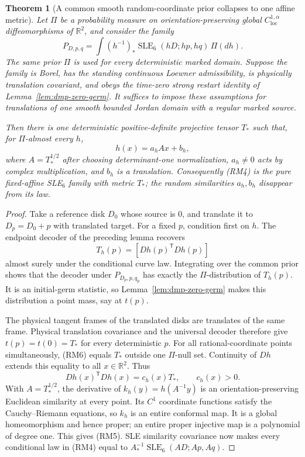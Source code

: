 \documentclass[11pt]{article}
\newtheorem{theorem}{Theorem}[section]
\theoremstyle{definition}\newtheorem{definition}[theorem]{Definition}
\theoremstyle{remark}\newtheorem{remark}[theorem]{Remark}
\begin{document}
\begin{theorem}[A common smooth random-coordinate prior collapses to one affine metric]
\label{thm:random-smooth-chart-rigidity}
Let $\Pi$ be a probability measure on orientation-preserving global
$C^{1,\alpha}_{\mathrm{loc}}$ diffeomorphisms of $\mathbb R^2$, and
consider the family
\[
 P_{D,p,q}=\int
 (h^{-1})_*\operatorname{SLE}_6(hD;hp,hq)\,\Pi(dh).
 \tag{RM4}
\]
The \emph{same prior $\Pi$} is used for every deterministic marked
domain. Suppose the family is Borel, has the standing continuous
Loewner admissibility, is physically translation covariant, and obeys
the time-zero strong restart identity of Lemma~\ref{lem:dmp-zero-germ}.
It suffices to impose these assumptions for translations of one smooth
bounded Jordan domain with a regular marked source.

Then there is one deterministic positive-definite projective tensor
$T_*$ such that, for $\Pi$-almost every $h$,
\[
 h(x)=a_h A x+b_h,
 \tag{RM5}
\]
where $A=T_*^{1/2}$ after choosing determinant-one normalization,
$a_h\ne0$ acts by complex multiplication, and $b_h$ is a translation.
Consequently (RM4) is the pure fixed-affine SLE$_6$ family with metric
$T_*$; the random similarities $a_h,b_h$ disappear from its law.
\end{theorem}
\begin{proof}
Take a reference disk $D_0$ whose source is $0$, and translate it to
$D_p=D_0+p$ with translated target. For a fixed $p$, condition first
on $h$. The endpoint decoder of the preceding lemma recovers
\[
 T_h(p)=[Dh(p)^{\mathsf T}Dh(p)]
 \tag{RM6}
\]
almost surely under the conditional curve law. Integrating over the
common prior shows that the decoder under $P_{D_p,p,q_p}$ has exactly
the $\Pi$-distribution of $T_h(p)$. It is an initial-germ statistic,
so Lemma~\ref{lem:dmp-zero-germ} makes this distribution a point mass,
say at $t(p)$.

The physical tangent frames of the translated disks are translates of
the same frame. Physical translation covariance and the universal
decoder therefore give $t(p)=t(0)=T_*$ for every deterministic $p$.
For all rational-coordinate points simultaneously, (RM6) equals $T_*$
outside one $\Pi$-null set. Continuity of $Dh$ extends this equality
to all $x\in\mathbb R^2$. Thus
\[
 Dh(x)^{\mathsf T}Dh(x)=c_h(x)T_*,\qquad c_h(x)>0.
 \tag{RM7}
\]
With $A=T_*^{1/2}$, the derivative of $k_h(y)=h(A^{-1}y)$ is an
orientation-preserving Euclidean similarity at every point. Its $C^1$
coordinate functions satisfy the Cauchy--Riemann equations, so $k_h$ is
an entire conformal map. It is a global homeomorphism and hence proper;
an entire proper injective map is a polynomial of degree one. This gives
(RM5). SLE similarity covariance now makes every conditional law in
(RM4) equal to $A^{-1}_*\operatorname{SLE}_6(AD;Ap,Aq)$.
\end{proof}
\end{document}

